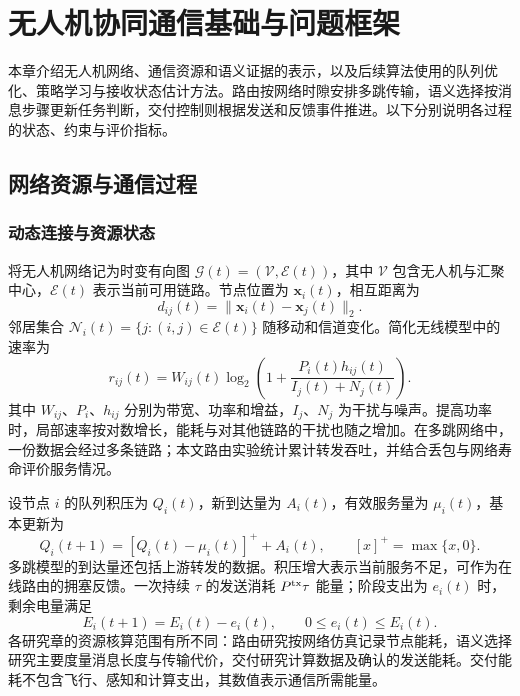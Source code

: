 \chapter{无人机协同通信基础与问题框架}
\label{ch:foundations}

本章介绍无人机网络、通信资源和语义证据的表示，以及后续算法使用的队列优化、策略学习与接收状态估计方法。路由按网络时隙安排多跳传输，语义选择按消息步骤更新任务判断，交付控制则根据发送和反馈事件推进。以下分别说明各过程的状态、约束与评价指标。

\section{网络资源与通信过程}
\subsection{动态连接与资源状态}

将无人机网络记为时变有向图 $\mathcal G(t)=(\mathcal V,\mathcal E(t))$，其中 $\mathcal V$ 包含无人机与汇聚中心，$\mathcal E(t)$ 表示当前可用链路。节点位置为 $\bm x_i(t)$，相互距离为
\begin{equation}
d_{ij}(t)=\|\bm x_i(t)-\bm x_j(t)\|_2.
\label{eq:base:distance}
\end{equation}
邻居集合 $\mathcal N_i(t)=\{j:(i,j)\in\mathcal E(t)\}$ 随移动和信道变化。简化无线模型中的速率为
\begin{equation}
r_{ij}(t)=W_{ij}(t)\log_2\left(1+
\frac{P_i(t)h_{ij}(t)}{I_j(t)+N_j(t)}\right).
\label{eq:base:rate}
\end{equation}
其中 $W_{ij}$、$P_i$、$h_{ij}$ 分别为带宽、功率和增益，$I_j$、$N_j$ 为干扰与噪声。提高功率时，局部速率按对数增长，能耗与对其他链路的干扰也随之增加。在多跳网络中，一份数据会经过多条链路；本文路由实验统计累计转发吞吐，并结合丢包与网络寿命评价服务情况。

设节点 $i$ 的队列积压为 $Q_i(t)$，新到达量为 $A_i(t)$，有效服务量为 $\mu_i(t)$，基本更新为
\begin{equation}
Q_i(t+1)=\left[Q_i(t)-\mu_i(t)\right]^++A_i(t),
\qquad [x]^+=\max\{x,0\}.
\label{eq:base:queue}
\end{equation}
多跳模型的到达量还包括上游转发的数据。积压增大表示当前服务不足，可作为在线路由的拥塞反馈。一次持续 $\tau$ 的发送消耗 $P^{\rm tx}\tau$ 能量；阶段支出为 $e_i(t)$ 时，剩余电量满足
\begin{equation}
E_i(t+1)=E_i(t)-e_i(t),\qquad 0\le e_i(t)\le E_i(t).
\label{eq:base:energy}
\end{equation}
各研究章的资源核算范围有所不同：路由研究按网络仿真记录节点能耗，语义选择研究主要度量消息长度与传输代价，交付研究计算数据及确认的发送能耗。交付能耗不包含飞行、感知和计算支出，其数值表示通信所需能量。

